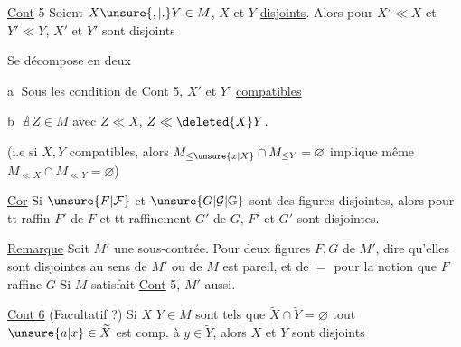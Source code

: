 \uline{Cont} 5 Soient $X\unsure{,|.}Y\in M$, $X$ et $Y$ \uline{disjoints}. Alors pour $X'\ll X$ et $Y'\ll Y$, $X'$ et $Y'$ sont   disjoints



Se décompose en deux

\textcircled{\scriptsize a} Sous les condition de Cont 5, $X'$ et $Y'$  \uline{compatibles}

\textcircled{\scriptsize b}  $\nexists\ Z\in M$ avec $Z\ll X$, $Z\ll\deleted{X}Y$.

(i.e si $X,Y$ compatibles, alors $M_{\leq\unsure{x|X}}\cap M_{\leq Y}=\varnothing$ implique même $M_{\ll X}\cap M_{\ll Y}=\varnothing$)

\uline{Cor} Si $\unsure{F|\mathcal F}$ et $\unsure{G|\mathcal G|\mathbb G}$ sont des figures disjointes, alors pour tt raffin $F'$ de $F$ et tt raffinement $G'$ de $G$, $F'$ et $G'$ sont disjointes.

\uline{Remarque} Soit $M'$ une sous-contrée. Pour deux figures $F,G$ de $M'$,   dire qu'elles sont disjointes au sens de $M'$ ou de $M$ est pareil, et de $=$ pour la notion que $F$ raffine $G$ Si $M$ satisfait \uline{Cont} 5, $M'$ aussi. 

\uline{Cont 6} (Facultatif ?) Si $X$  $Y\in M$ sont tels que \deleted{$\unsure{\forall}$} $\widetilde X\cap\widetilde Y=\varnothing$  tout $\unsure{a|x}\in\widetilde X$ est comp. à  $y\in\widetilde Y$, alors $X$ et $Y$ sont disjoints
